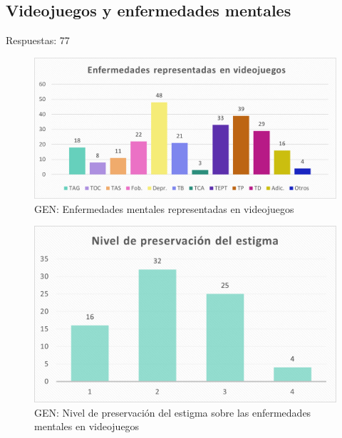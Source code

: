 \documentclass[12pt, a4paper,twoside,titlepage]{book}
\newcommand{\comm}[1]{\todo[linecolor=yellow]{\textsf{#1}}}
\begin{document}
\subsection{Videojuegos y enfermedades mentales}
\label{sec:listadoVid}


Respuestas: 77


\begin{figure}
	\centering
	\includegraphics[width=.8\linewidth]{ANEXO Gen/15AnexGENEnfvid}
	\caption{GEN: Enfermedades mentales representadas en videojuegos}
	\label{fig:GENEnfvid}
\end{figure}


\begin{figure}
	\centering
	\includegraphics[width=.8\linewidth]{ANEXO Gen/16AnexGENEst}
	\caption{GEN: Nivel de preservación del estigma sobre las enfermedades mentales en videojuegos}
	\label{fig:GENEstigma}
\end{figure}
\end{document}
